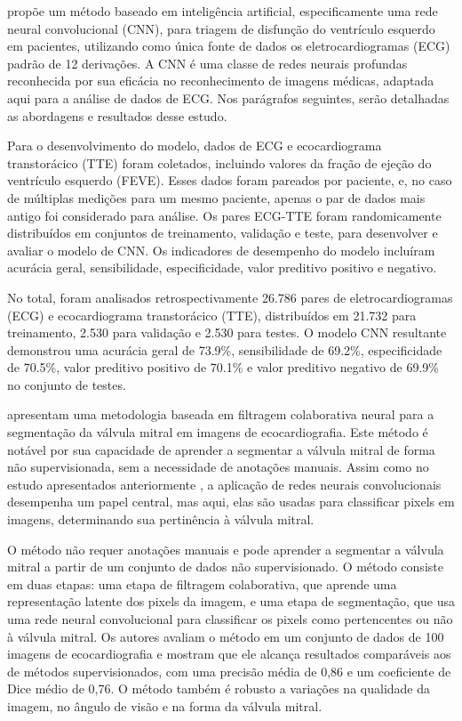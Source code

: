 \textcite{Sun2021} propõe um método baseado em inteligência artificial, especificamente uma rede neural convolucional (CNN), para triagem de disfunção do ventrículo esquerdo em pacientes, utilizando como única fonte de dados os eletrocardiogramas (ECG) padrão de 12 derivações. A CNN é uma classe de redes neurais profundas reconhecida por sua eficácia no reconhecimento de imagens médicas, adaptada aqui para a análise de dados de ECG. Nos parágrafos seguintes, serão detalhadas as abordagens e resultados desse estudo.

Para o desenvolvimento do modelo, dados de ECG e ecocardiograma transtorácico (TTE) foram coletados, incluindo valores da fração de ejeção do ventrículo esquerdo (FEVE). Esses dados foram pareados por paciente, e, no caso de múltiplas medições para um mesmo paciente, apenas o par de dados mais antigo foi considerado para análise. Os pares ECG-TTE foram randomicamente distribuídos em conjuntos de treinamento, validação e teste, para desenvolver e avaliar o modelo de CNN. Os indicadores de desempenho do modelo incluíram acurácia geral, sensibilidade, especificidade, valor preditivo positivo e negativo.

No total, foram analisados retrospectivamente 26.786 pares de eletrocardiogramas (ECG) e ecocardiograma transtorácico (TTE), distribuídos em 21.732 para treinamento, 2.530 para validação e 2.530 para testes. O modelo CNN resultante demonstrou uma acurácia geral de 73.9\%, sensibilidade de 69.2\%, especificidade de 70.5\%, valor preditivo positivo de 70.1\% e valor preditivo negativo de 69.9\% no conjunto de testes.



\textcite{corinzia2020neural} apresentam uma metodologia baseada em filtragem colaborativa neural para a segmentação da válvula mitral em imagens de ecocardiografia. Este método é notável por sua capacidade de aprender a segmentar a válvula mitral de forma não supervisionada, sem a necessidade de anotações manuais. Assim como no estudo apresentados anteriormente , a aplicação de redes neurais convolucionais desempenha um papel central, mas aqui, elas são usadas para classificar pixels em imagens, determinando sua pertinência à válvula mitral. 

O método não requer anotações manuais e pode aprender a segmentar a válvula mitral a partir de um conjunto de dados não supervisionado. O método consiste em duas etapas: uma etapa de filtragem colaborativa, que aprende uma representação latente dos pixels da imagem, e uma etapa de segmentação, que usa uma rede neural convolucional para classificar os pixels como pertencentes ou não à válvula mitral. Os autores avaliam o método em um conjunto de dados de 100 imagens de ecocardiografia e mostram que ele alcança resultados comparáveis aos de métodos supervisionados, com uma precisão média de 0,86 e um coeficiente de Dice médio de 0,76. O método também é robusto a variações na qualidade da imagem, no ângulo de visão e na forma da válvula mitral.

